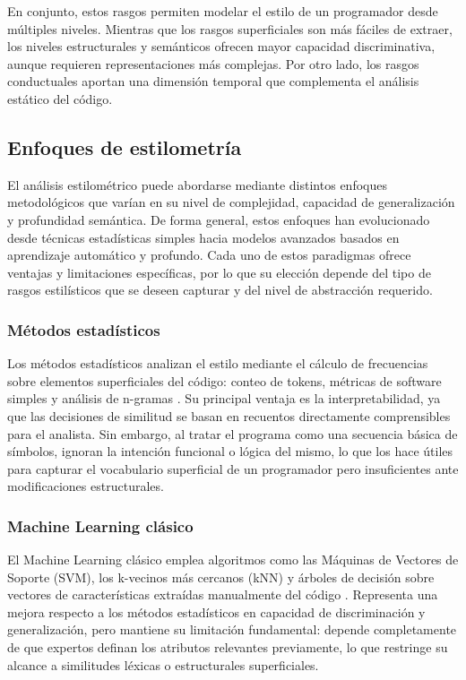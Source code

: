 En conjunto, estos rasgos permiten modelar el estilo de un programador desde múltiples niveles. Mientras que los rasgos superficiales son más fáciles de extraer, los niveles estructurales y semánticos ofrecen mayor capacidad discriminativa, aunque requieren representaciones más complejas. Por otro lado, los rasgos conductuales aportan una dimensión temporal que complementa el análisis estático del código.
\subsection{Enfoques de estilometría}

El análisis estilométrico puede abordarse mediante distintos enfoques metodológicos que varían en su nivel de complejidad, capacidad de generalización y profundidad semántica. De forma general, estos enfoques han evolucionado desde técnicas estadísticas simples hacia modelos avanzados basados en aprendizaje automático y profundo. Cada uno de estos paradigmas ofrece ventajas y limitaciones específicas, por lo que su elección depende del tipo de rasgos estilísticos que se deseen capturar y del nivel de abstracción requerido.

\subsubsection{Métodos estadísticos}

Los métodos estadísticos analizan el estilo mediante el cálculo de 
frecuencias sobre elementos superficiales del código: conteo de tokens, 
métricas de software simples y análisis de n-gramas 
\cite{Horvath2026ProgrammerAttribution}. Su principal ventaja es la 
interpretabilidad, ya que las decisiones de similitud se basan en 
recuentos directamente comprensibles para el analista. Sin embargo, 
al tratar el programa como una secuencia básica de símbolos, ignoran 
la intención funcional o lógica del mismo, lo que los hace útiles para 
capturar el vocabulario superficial de un programador pero insuficientes 
ante modificaciones estructurales.

\subsubsection{Machine Learning clásico}

El Machine Learning clásico emplea algoritmos como las Máquinas de 
Vectores de Soporte (SVM), los k-vecinos más cercanos (kNN) y árboles 
de decisión sobre vectores de características extraídas manualmente del 
código \cite{Horvath2026ProgrammerAttribution}. Representa una mejora 
respecto a los métodos estadísticos en capacidad de discriminación y 
generalización, pero mantiene su limitación fundamental: depende 
completamente de que expertos definan los atributos relevantes 
previamente, lo que restringe su alcance a similitudes léxicas o 
estructurales superficiales.

